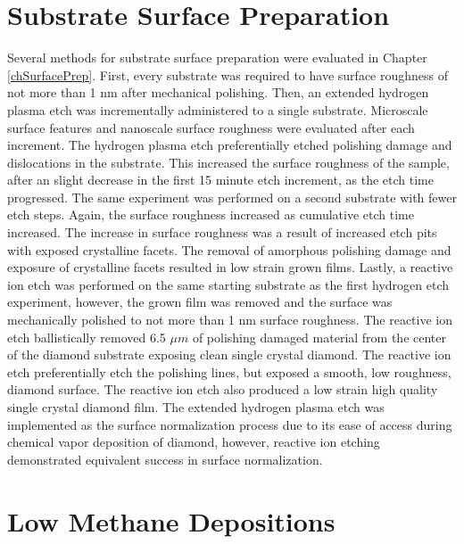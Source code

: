 \section{Substrate Surface Preparation}
\indent

Several methods for substrate surface preparation were evaluated in Chapter \ref{chSurfacePrep}. First, every substrate was required to have surface roughness of not more than 1 nm after mechanical polishing. Then, an extended hydrogen plasma etch was incrementally administered to a single substrate. Microscale surface features and nanoscale surface roughness were evaluated after each increment. The hydrogen plasma etch preferentially etched polishing damage and dislocations in the substrate. This increased the surface roughness of the sample, after an slight decrease in the first 15 minute etch increment, as the etch time progressed. The same experiment was performed on a second substrate with fewer etch steps. Again, the surface roughness increased as cumulative etch time increased. The increase in surface roughness was a result of increased etch pits with exposed crystalline facets. The removal of amorphous polishing damage and exposure of crystalline facets resulted in low strain grown films. Lastly, a reactive ion etch was performed on the same starting substrate as the first hydrogen etch experiment, however, the grown film was removed and the surface was mechanically polished to not more than 1 nm surface roughness. The reactive ion etch ballistically removed 6.5 $\mu m$ of polishing damaged material from the center of the diamond substrate exposing clean single crystal diamond. The reactive ion etch preferentially etch the polishing lines, but exposed a smooth, low roughness, diamond surface. The reactive ion etch also produced a low strain high quality single crystal diamond film. The extended hydrogen plasma etch was implemented as the surface normalization process due to its ease of access during chemical vapor deposition of diamond, however, reactive ion etching demonstrated equivalent success in surface normalization.

\section{Low Methane Depositions}
\indent

